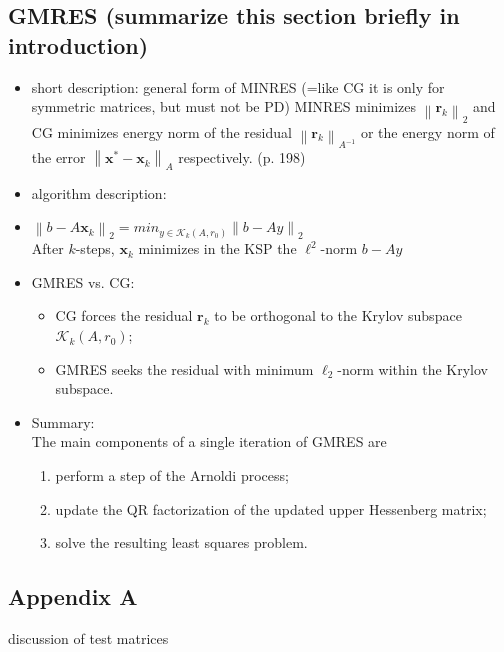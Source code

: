 \documentclass{scrartcl}
\newcommand{\norm}[1]{\left\lVert#1\right\rVert}
\begin{document}
\subsection*{GMRES (summarize this section briefly in introduction)}
\begin{itemize}
\item short description: general form of MINRES (=like CG it is only for symmetric matrices, but must not be PD) MINRES minimizes $\norm{\textbf{r}_k}_2$ and CG minimizes energy norm of the residual $\norm{\textbf{r}_k}_{A^{-1}}$ or the energy norm of the error $\norm{\textbf{x}^* - \textbf{x}_k}_A$ respectively. \cite{Ascher:2011:FCN:2031413} (p. 198)
\item algorithm description:
\item $\norm{b - A\textbf{x}_k}_2 = min_{y \in \mathcal{K}_k(A, r_0)}\norm{b - Ay}_2$\\
	 After $k$-steps, $\textbf{x}_k$ minimizes in the KSP the $\ell^2$-norm $b - Ay$
\item GMRES vs. CG:
\begin{itemize}
\item CG forces the residual $\textbf{r}_k$ to be orthogonal to the Krylov subspace $\mathcal{K}_k(A, r_0)$;
\item GMRES seeks the residual with minimum $\ell_2$-norm within the Krylov subspace.
\end{itemize}
\item Summary:\\
The main components of a single iteration of GMRES are
\begin{enumerate}
	\item perform a step of the Arnoldi process;
	\item update the QR factorization of the updated upper Hessenberg matrix;
	\item solve the resulting least squares problem.
	\end{enumerate}
\end{itemize}




\begin{appendices}
\section*{Appendix A}
discussion of test matrices
\end{appendices}
\end{document}
